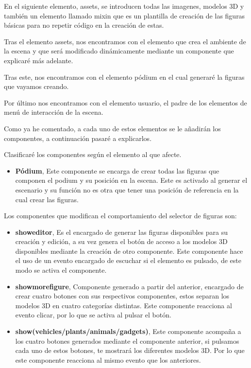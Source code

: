 \documentclass[a4paper, 12pt]{book}
\begin{document}
En el siguiente elemento, assets, se introducen todas las imagenes, modelos 3D y también un elemento llamado mixin que es un plantilla de creación de las figuras básicas para no repetir código en la creación de estas.

Tras el elemento assets, nos encontramos con el elemento que crea el ambiente de la escena y que será modificado dinámicamente mediante un componente que explicaré más adelante.

Tras este, nos encontramos con el elemento pódium en el cual generaré la figuras que vayamos creando.

Por último nos encontramos con el elemento usuario, el  padre de los elementos de menú de interacción de la escena.

Como ya he comentado, a cada uno de estos elementos se le añadirán los componentes, a continuación pasaré a explicarlos.

Clasificaré los componentes según el elemento al que afecte.

\begin{itemize}
    \item \textbf{Pódium}, Este componente se encarga de crear todas las figuras que componen el podium y su posición en la escena. Este es activado al generar el escenario y su función no es otra que tener una posición de referencia en la cual crear las figuras.
\end{itemize}

Los componentes que modifican el comportamiento del selector de figuras son:
\begin{itemize}
    \item \textbf{showeditor}, Es el encargado de generar las figuras disponibles para su creación y edición, a su vez genera el botón de acceso a los modelos 3D disponibles mediante la creación de otro componente. Este componente hace el uso de un evento encargado de escuchar si el elemento es pulsado, de este modo se activa el componente.
    
    \item \textbf{showmorefigure}, Componente generado a partir del anterior, encargado de crear cuatro botones con sus respectivos componentes, estos separan los modelos 3D en cuatro categorías distintas. Este componente reacciona al evento clicar, por lo que se activa al pulsar el botón.

    \item \textbf{show(vehicles/plants/animals/gadgets)}, Este componente acompaña a los cuatro botones generados mediante el componente anterior, si pulsamos cada uno de estos botones, te mostrará los diferentes modelos 3D. Por lo que este componente reacciona al mismo evento que los anteriores.

\end{itemize}
\end{document}
